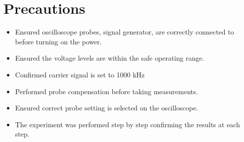 \section*{Precautions}
\begin{itemize}
\item Ensured oscilloscope probes, signal generator, are correctly connected to before turning on the power.
\item Ensured the voltage levels are within the safe operating range.
\item Confirmed carrier signal is set to 1000 kHz
\item Performed probe compensation before taking measurements.
\item Ensured correct probe setting is selected on the oscilloscope.
\item The experiment was performed step by step confirming the results at each step.
\end{itemize}